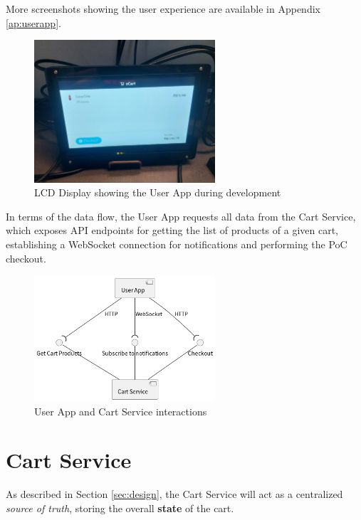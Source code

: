 \documentclass[openright]{normas-utf-tex} %
\begin{document}
More screenshots showing the user experience are available in Appendix \ref{ap:userapp}.

\begin{figure}[H]
	\centering
	\includegraphics[width=0.6\textwidth]{./images/lcddisplay.jpeg}
	\caption[LCD Display showing the User App during development]{LCD Display showing the User App during development}
	\label{fig:dummy}
\end{figure}

In terms of the data flow, the User App requests all data from the Cart Service, which exposes API endpoints for
getting the list of products of a given cart, establishing a WebSocket connection for notifications and performing
the PoC checkout.

\begin{figure}[H]
	\centering
	\includegraphics[width=0.6\textwidth]{./images/diagrams/UserApp.png}
	\caption[User App and Cart Service interactions]{User App and Cart Service interactions}
	\label{fig:dummy}
\end{figure}

\section{Cart Service}

As described in Section \ref{sec:design}, the Cart Service will act as a
centralized \textit{source of truth}, storing the overall \textbf{state} of the
cart.
\end{document}
